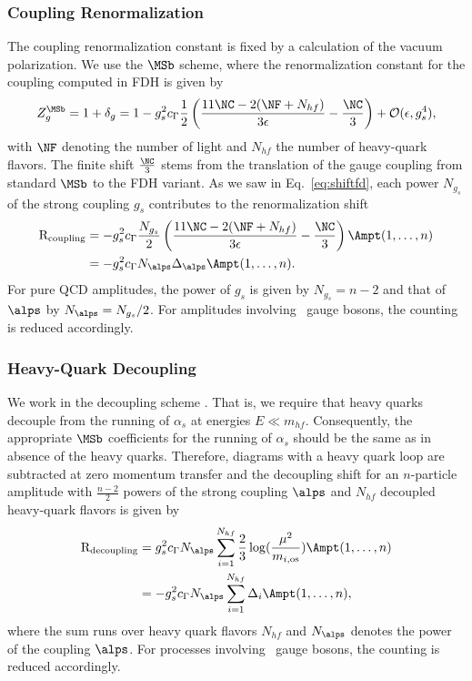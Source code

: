 \subsubsection{Coupling Renormalization}
The coupling renormalization constant is fixed by a
calculation of the
vacuum polarization. We use the $\MSb$ scheme, where the
renormalization constant for the coupling computed in FDH is given by
\begin{align}
 Z_g^{\MSb}=1+\delta_g=1-g_s^2c_\Gamma\frac{1}{2}\left(\frac{11\NC-2(\NF+N_{hf})}{3\epsilon}-\frac{\NC}{3}\right)
 + \mathcal{O}(\epsilon,g_s^4),
\end{align}
with $\NF$ denoting the number of light and $N_{hf}$ the
number of heavy-quark flavors. The finite shift $\frac{\NC}{3}$ stems
from the translation of the gauge coupling from standard $\MSb$ to the
FDH variant. As we saw in Eq.~\eqref{eq:shiftfd}, each power $N_{g_s}$ of the strong coupling $g_s$ contributes to the renormalization shift
\begin{align}
\begin{split}
 \text{R}_{\text{coupling}} &= -g_s^{2}c_\Gamma \frac{N_{g_s}}{2}
 \left(\frac{11\NC-2(\NF+N_{hf})}{3\epsilon}-\frac{\NC}{3}\right)\Ampt(1,\dots,n)\\
 &= -g_s^{2}c_\Gamma N_{\alps} \Delta_{\alps}\Ampt(1,\dots,n).
\end{split}
\end{align}
For pure QCD amplitudes, the power of $g_s$ is given by
$N_{g_s}=n-2$ and that of $\alps$ by $N_{\alps}=N_{g_s}/2$. For amplitudes
involving \ew~gauge bosons, the counting is reduced accordingly.
\subsubsection{Heavy-Quark Decoupling}
We work in the decoupling scheme \cite{Collins1978a}. That is, we require
that heavy quarks decouple from the running of
$\alpha_s$ at energies $E\ll m_{hf}$. Consequently, the appropriate $\MSb$ coefficients for the
running of $\alpha_s$ should be the same as in absence of the heavy
quarks. Therefore, diagrams with a heavy quark loop
are subtracted at zero momentum transfer and the decoupling shift for an
$n$-particle amplitude with $\frac{n-2}{2}$ powers of the strong
coupling $\alps$ and $N_{hf}$ decoupled heavy-quark flavors is
given by
\begin{align}
\begin{split}
\text{R}_{\text{decoupling}}&= g_s^{2}c_\Gamma
N_{\alps}\sum_{i=1}^{N_{hf}}
\frac{2}{3}\log(\frac{\mu^2}{m_{i,\text{os}}}) \Ampt(1,\dots,n)\\
&= -g_s^{2}c_\Gamma N_{\alps}\sum_{i=1}^{N_{hf}}
\Delta_i\Ampt(1,\dots,n),
\end{split}
\end{align}
where the sum runs over heavy quark flavors $N_{hf}$ and $N_{\alps}$ denotes the power of the coupling $\alps$. For processes involving \ew~gauge bosons, the counting is
reduced accordingly.

